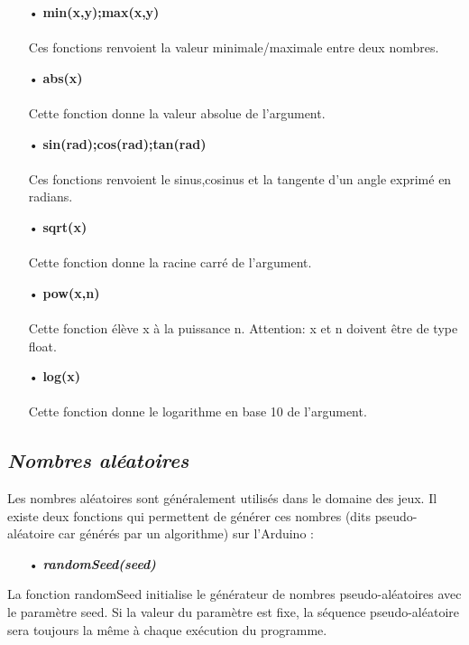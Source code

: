 \documentclass[12pt,a4paper]{article}
\begin{document}
\begin{itemize}
    \item[•] \textbf{min(x,y);max(x,y)}
\\
\\
Ces fonctions renvoient la valeur  minimale/maximale entre deux nombres. 
    \item[•] \textbf{abs(x)}
\\
\\
Cette fonction donne la valeur absolue de l’argument.

\bigskip
    \item[•] \textbf{sin(rad);cos(rad);tan(rad)}
\\
\\
Ces fonctions renvoient le sinus,cosinus et la tangente d’un angle exprimé en radians.

\bigskip
    \item[•] \textbf{sqrt(x)}
\\
\\
Cette fonction donne la racine carré de l’argument.

\bigskip
    \item[•] \textbf{pow(x,n)}
\\
\\
Cette fonction élève x à la puissance n. Attention: x et n doivent être de type float.

\bigskip
    \item[•] \textbf{log(x)}
\\
\\
Cette fonction donne le logarithme en base 10 de l’argument.
\end{itemize}


\subsection{\textit{\textbf{Nombres aléatoires}}}
\bigskip
Les nombres aléatoires sont généralement utilisés dans le domaine des jeux. Il existe deux fonctions qui permettent de générer ces nombres (dits pseudo-aléatoire car générés par un algorithme) sur l'Arduino :

\begin{itemize}
\bigskip
    \item[•] \textit{\textbf{randomSeed(seed)}}
\end{itemize}
La fonction randomSeed initialise le générateur de nombres pseudo-aléatoires avec le paramètre seed. Si la valeur du paramètre est fixe, la séquence pseudo-aléatoire sera toujours la même à chaque exécution du programme. 
\end{document}
